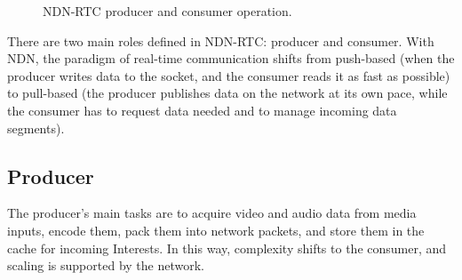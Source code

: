 \documentclass{icn/sig-alternate-2012} %
\newcommand{\ndnrtcName}{NDN-RTC} %
\begin{document}
\begin{figure}[t!]
\centering
{}\qquad
{}
\caption{\ndnrtcName{} producer and consumer operation.}
\end{figure}



There are two main roles defined in \ndnrtcName{}: producer and consumer. With NDN, the paradigm of real-time communication shifts from push-based (when the producer writes data to the socket, and the consumer reads it as fast as possible) to pull-based (the producer publishes data on the network at its own pace, while the consumer has to request data needed and to manage incoming data segments).

%


\subsection{Producer}
The producer's main tasks are to acquire video and audio data from media inputs, encode them, pack them into network packets, and store them in the cache for incoming Interests. In this way, complexity shifts to the consumer, and scaling is supported by the network.
\end{document}
